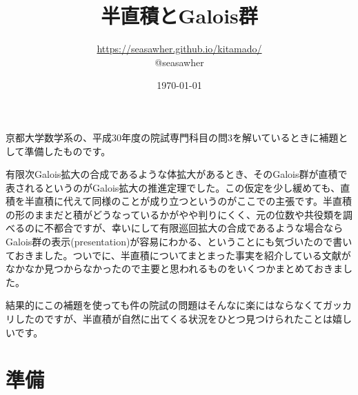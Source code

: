 \documentclass[10pt]{jsarticle}%
\begin{document}
\title{半直積とGalois群}
\author{\url{https://seasawher.github.io/kitamado/} \\ @seasawher}
\date{\today}
\maketitle

京都大学数学系の、平成30年度の院試専門科目の問3を解いているときに補題として準備したものです。

有限次Galois拡大の合成であるような体拡大があるとき、そのGalois群が直積で表されるというのがGalois拡大の推進定理でした。この仮定を少し緩めても、直積を半直積に代えて同様のことが成り立つというのがここでの主張です。半直積の形のままだと積がどうなっているかがやや判りにくく、元の位数や共役類を調べるのに不都合ですが、幸いにして有限巡回拡大の合成であるような場合ならGalois群の表示(presentation)が容易にわかる、ということにも気づいたので書いておきました。ついでに、半直積についてまとまった事実を紹介している文献がなかなか見つからなかったので主要と思われるものをいくつかまとめておきました。

結果的にこの補題を使っても件の院試の問題はそんなに楽にはならなくてガッカリしたのですが、半直積が自然に出てくる状況をひとつ見つけられたことは嬉しいです。




\section*{準備}
\end{document}
